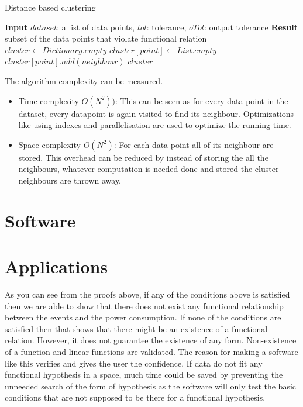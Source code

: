 \begin{algorithm}
	\caption{Distance based clustering}\label{dbscanExistence}
	\begin{algorithmic}[1]
		\State \textbf{Input} $dataset$: a list of data points, $tol$: tolerance, $oTol$: output tolerance
		\State \textbf{Result} subset of the data points that violate functional relation
		\State $cluster \gets Dictionary.empty$
		 
		\State $cluster[point] \gets List.empty$ 	
         
        \State $cluster[point].add(neighbour)$
        \EndIf
        \EndFor
        \EndFor
        \State\Return $cluster$
		\EndProcedure
	\end{algorithmic}
\end{algorithm}


The algorithm complexity can be measured. 
\begin{itemize}
	\item Time complexity \(O(N^2))\): This can be seen as for every data point in the dataset, every datapoint is again visited to find its neighbour. Optimizations like using indexes and parallelisation are used to optimize the running time.
	\item Space complexity \(O(N^2)\): For each data point all of its neighbour are stored. This overhead can be reduced by instead of storing the all the neighbours, whatever computation is needed done and stored the cluster neighbours are thrown away. 
\end{itemize}

\section{Software}


\section{Applications}

As you can see from the proofs above, if any of the conditions above is satisfied then we are able to show that there does not exist any functional relationship between the events and the power consumption. If none of the conditions are satisfied then that shows that there might be an existence of a functional relation. However, it does not guarantee the existence of any form. Non-existence of a function and linear functions are validated. The reason for making a software like this verifies and gives the user the confidence. If data do not fit any functional hypothesis in a space, much time could be saved by preventing the unneeded search of the form of hypothesis as the software will only test the basic conditions that are not supposed to be there for a functional hypothesis.

